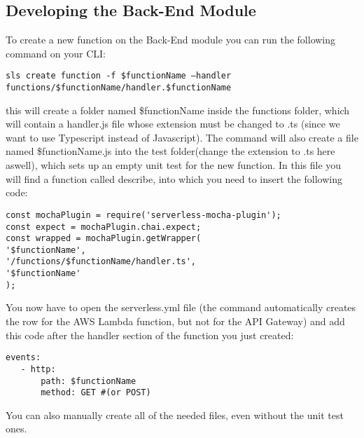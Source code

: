 \subsection{Developing the Back-End Module}
To create a new function on the Back-End module you can run the following command on your CLI: 
\begin{center}
\texttt{sls create function -f \$functionName --handler functions/\$functionName/handler.\$functionName}
\end{center}
this will create a folder named \$functionName inside the functions folder, which will contain a handler.js file whose extension must be changed to .ts (since we want to use Typescript instead of Javascript). 
The command will also create a file named \$functionName.js into the test folder(change the extension to .ts here aswell), which sets up an empty unit test for the new function.
In this file you will find a function called describe, into which you need to insert the following code:
\begin{lstlisting}
const mochaPlugin = require('serverless-mocha-plugin');
const expect = mochaPlugin.chai.expect;
const wrapped = mochaPlugin.getWrapper(
'$functionName', 
'/functions/$functionName/handler.ts',
'$functionName'
);
\end{lstlisting}
You now have to open the serverless.yml file (the command automatically creates the row for the AWS Lambda function, but not for the API Gateway) and add this code after the handler section of the function you just created:
\begin{lstlisting}
events:
   - http:
       path: $functionName
       method: GET #(or POST)
\end{lstlisting}
You can also manually create all of the needed files, even without the unit test ones.